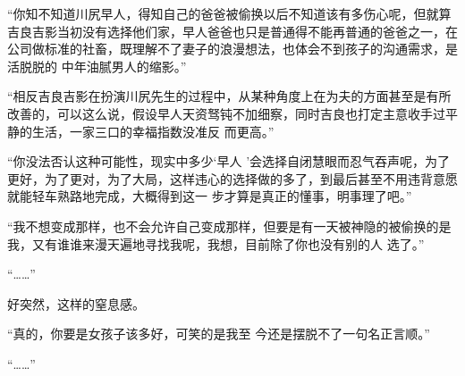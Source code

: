 \documentclass{article}
\begin{document}
“你知不知道川尻早人，得知自己的爸爸被偷换以后不知道该有多伤心呢，但就算吉良吉影当初没有选择他们家，早人爸爸也只是普通得不能再普通的爸爸之一，在公司做标准的社畜，既理解不了妻子的浪漫想法，也体会不到孩子的沟通需求，是活脱脱的
中年油腻男人的缩影。” 

“相反吉良吉影在扮演川尻先生的过程中，从某种角度上在为夫的方面甚至是有所改善的，可以这么说，假设早人天资驽钝不加细察，同时吉良也打定主意收手过平静的生活，一家三口的幸福指数没准反
而更高。” 

“你没法否认这种可能性，现实中多少‘早人
\newpage
’会选择自闭慧眼而忍气吞声呢，为了更好，为了更对，为了大局，这样违心的选择做的多了，到最后甚至不用违背意愿就能轻车熟路地完成，大概得到这一
步才算是真正的懂事，明事理了吧。” 

“我不想变成那样，也不会允许自己变成那样，但要是有一天被神隐的被偷换的是我，又有谁谁来漫天遍地寻找我呢，我想，目前除了你也没有别的人
选了。” 


“……” 


好突然，这样的窒息感。 

“真的，你要是女孩子该多好，可笑的是我至
今还是摆脱不了一句名正言顺。” 

“……”
\end{document}
